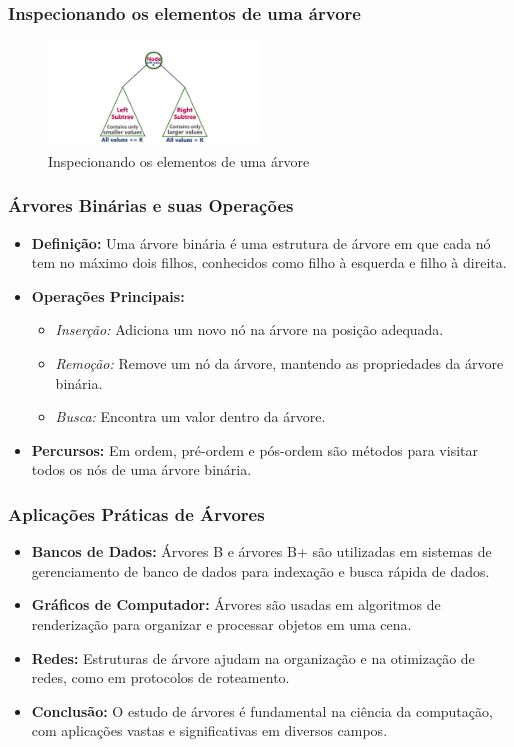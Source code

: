 \begin{frame}[fragile]
  \frametitle{Inspecionando os elementos de uma árvore}
  \begin{figure}
    \centering
    \includegraphics[width=0.5\textwidth]{assets/aula5-arvores3.png}
    \caption{Inspecionando os elementos de uma árvore}
  \end{figure}
\end{frame}
\begin{frame}[fragile]
  \frametitle{Árvores Binárias e suas Operações}
  \begin{itemize}
    \item \textbf{Definição:} Uma árvore binária é uma estrutura de árvore em que cada nó tem no máximo dois filhos, conhecidos como filho à esquerda e filho à direita.
    \item \textbf{Operações Principais:}
      \begin{itemize}
        \item \textit{Inserção:} Adiciona um novo nó na árvore na posição adequada.
        \item \textit{Remoção:} Remove um nó da árvore, mantendo as propriedades da árvore binária.
        \item \textit{Busca:} Encontra um valor dentro da árvore.
      \end{itemize}
    \item \textbf{Percursos:} Em ordem, pré-ordem e pós-ordem são métodos para visitar todos os nós de uma árvore binária.
  \end{itemize}
\end{frame}

\begin{frame}[fragile]
  \frametitle{Aplicações Práticas de Árvores}
  \begin{itemize}
    \item \textbf{Bancos de Dados:} Árvores B e árvores B+ são utilizadas em sistemas de gerenciamento de banco de dados para indexação e busca rápida de dados.
    \item \textbf{Gráficos de Computador:} Árvores são usadas em algoritmos de renderização para organizar e processar objetos em uma cena.
    \item \textbf{Redes:} Estruturas de árvore ajudam na organização e na otimização de redes, como em protocolos de roteamento.
    \item \textbf{Conclusão:} O estudo de árvores é fundamental na ciência da computação, com aplicações vastas e significativas em diversos campos.
  \end{itemize}
\end{frame}

